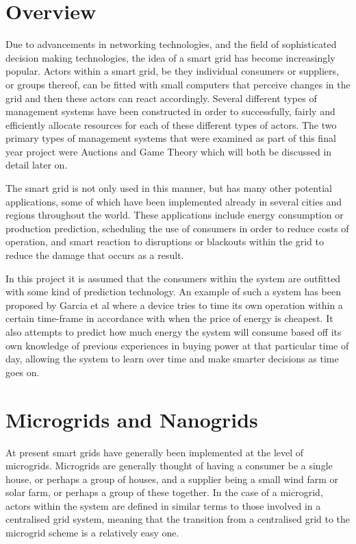 \documentclass[a4paper, notitlepage]{report}
\begin{document}
\section{Overview}
\label{sec:orgdce9eed}
Due to advancements in networking technologies, and the field of sophisticated
decision making technologies, the idea of a smart grid has become increasingly
popular. Actors within a smart grid, be they individual consumers or suppliers,
or groups thereof, can be fitted with small computers that perceive changes in
the grid and then these actors can react accordingly. Several different types of
management systems have been constructed in order to successfully, fairly and
efficiently allocate resources for each of these different types of actors. The
two primary types of management systems that were examined as part of this final
year project were Auctions and Game Theory which will both be discussed in
detail later on. 

The smart grid is not only used in this manner, but has many other potential
applications, some of which have been implemented already in several cities and
regions throughout the world. These applications include energy consumption or
production prediction, scheduling the use of consumers in order to reduce costs
of operation, and smart reaction to disruptions or blackouts within the grid to
reduce the damage that occurs as a result. 

In this project it is assumed that the consumers within the system are outfitted
with some kind of prediction technology. An example of such a system has been
proposed by Garcia et al \cite{mohsenian2010optimal} where a device tries to time
its own operation within a certain time-frame in accordance with when the price
of energy is cheapest. It also attempts to predict how much energy the system
will consume based off its own knowledge of previous experiences in buying power
at that particular time of day, allowing the system to learn over time and make
smarter decisions as time goes on. 
\section{Microgrids and Nanogrids}
\label{sec:org322ad40}
At present smart grids have generally been implemented at the level of
microgrids. Microgrids are generally thought of having a consumer be a single
house, or perhaps a group of houses, and a supplier being a small wind farm or
solar farm, or perhaps a group of these together. In the case of a microgrid,
actors within the system are defined in similar terms to those involved in a
centralised grid system, meaning that the transition from a centralised grid to
the microgrid scheme is a relatively easy one.
\end{document}
